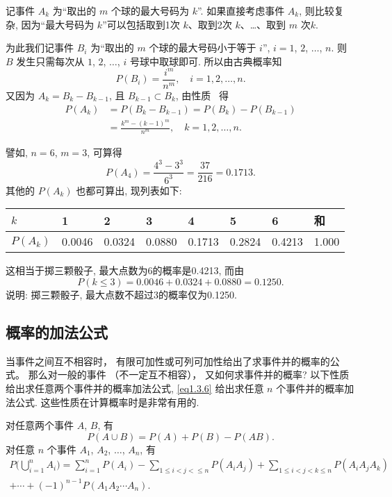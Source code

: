 \begin{solution}
  记事件 $A_k$ 为“取出的 $m$ 个球的最大号码为 $k$”.
  如果直接考虑事件 $A_k$,
  则比较复杂,
  因为“最大号码为 $k$”可以包括取到1次 $k$、取到2次 $k$、\dots、取到 $m$ 次$k$.

  为此我们记事件 $B_i$ 为“取出的 $m$ 个球的最大号码小于等于 $i$”, $i=1$, $2$, $\dotsc$, $n$.
  则 $B$ 发生只需每次从 $1$, $2$, $\dotsc$, $i$ 号球中取球即可.
  所以由古典概率知
  \[
    P(B_i) = \frac{i^m}{n^m}, \quad i = 1, 2, \dotsc, n.
  \]
  又因为 $A_k = B_k - B_{k-1}$,
  且 $B_{k-1} \subset B_k$,
  由性质~\label{property1.3.4} 得
  \begin{align*}
    P(A_k) &= P(B_k - B_{k-1}) = P(B_k) - P(B_{k-1})\\
    &= \frac{k^m - (k - 1)^m}{n^m}, \quad k = 1,2, \dotsc, n.
  \end{align*}

  譬如,
  $n = 6$, $m = 3$,
  可算得
  \[
    P(A_4) = \frac{4^3 - 3^3}{6^3} = \frac{37}{216} = 0.1713.
  \]
  其他的 $P(A_k)$ 也都可算出,
  现列表如下:

  \begin{tabularx}{\linewidth}{*{8}{Z}}
    \toprule
    $k$ & 1 & 2 & 3 & 4 & 5 & 6 & 和\\
    \midrule
    $P(A_k)$ & 0.0046 & 0.0324 & 0.0880 & 0.1713 & 0.2824 & 0.4213 & 1.000\\
    \bottomrule
  \end{tabularx}

  这相当于掷三颗骰子,
  最大点数为6的概率是0.4213,
  而由
  \[
    P(k \le 3) = 0.0046 + 0.0324 + 0.0880 = 0.1250.
  \]
  说明:
  掷三颗骰子,
  最大点数不超过3的概率仅为0.1250.
\end{solution}

\subsection{概率的加法公式}

当事件之间互不相容时，
有限可加性或可列可加性给出了求事件并的概率的公式。
那么对一般的事件 （不一定互不相容），
又如何求事件并的概率?
以下性质~\label{property1.3.6} 给出求任意两个事件并的概率加法公式,
\eqref{eq1.3.6} 给出求任意 $n$ 个事件并的概率加法公式.
这些性质在计算概率时是非常有用的.

\begin{property}[加法公式]\label{property1.3.6}
  对任意两个事件 $A$, $B$, 有
  \begin{equation}
    P(A \cup B) = P(A) + P(B) - P(AB).
    \label{eq1.3.5}
  \end{equation}
  对任意 $n$ 个事件 $A_1$, $A_2$, $\dotsc$, $A_n$, 有
  \begin{multline}
    P \biggl( \bigcup_{i=1}^n A_i \biggr) = \sum_{i=1}^n P (A_i)
    - \sum_{1 \le i < j < \le n} P(A_i A_j)
    + \sum_{1 \le i < j < k \le n} P(A_i A_j A_k)\\
    + \dotsb + (-1)^{n-1} P(A_1 A_2 \dotsb A_n).
    \label{eq1.3.6}
  \end{multline}
\end{property}

